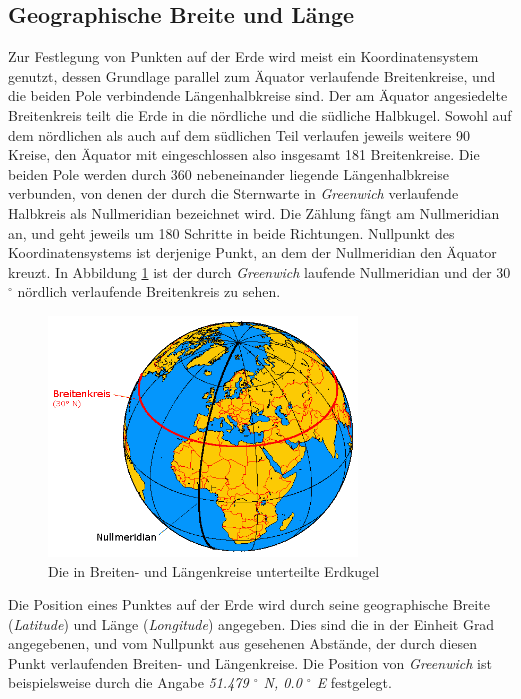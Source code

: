 \subsection{Geographische Breite und Länge}

Zur Festlegung von Punkten auf der Erde wird meist ein
Koordinatensystem genutzt, dessen Grundlage parallel zum Äquator
verlaufende Breitenkreise, und die beiden Pole verbindende
Längenhalbkreise sind. Der am Äquator angesiedelte Breitenkreis teilt
die Erde in die nördliche und die südliche Halbkugel. Sowohl auf dem
nördlichen als auch auf dem südlichen Teil verlaufen jeweils weitere
90 Kreise, den Äquator mit eingeschlossen also insgesamt 181
Breitenkreise. Die beiden Pole werden durch 360 nebeneinander liegende
Längenhalbkreise verbunden, von denen der durch die Sternwarte in
\textit{Greenwich} verlaufende Halbkreis als Nullmeridian bezeichnet
wird. Die Zählung fängt am Nullmeridian an, und geht jeweils um 180
Schritte in beide Richtungen. Nullpunkt des Koordinatensystems ist
derjenige Punkt, an dem der Nullmeridian den Äquator kreuzt. In
Abbildung \ref{koordinaten} ist der durch \textit{Greenwich} laufende
Nullmeridian und der 30 $^\circ$ nördlich verlaufende Breitenkreis zu
sehen.

\begin{figure}[h]
  \includegraphics[width=310px]{bilder/koordinaten}
  \caption{Die in Breiten- und Längenkreise unterteilte Erdkugel}
  \label{koordinaten}
\end{figure}

Die Position eines Punktes auf der Erde wird durch seine geographische
Breite (\textit{Latitude}) und Länge (\textit{Longitude})
angegeben. Dies sind die in der Einheit Grad angegebenen, und vom
Nullpunkt aus gesehenen Abstände, der durch diesen Punkt verlaufenden
Breiten- und Längenkreise. Die Position von \textit{Greenwich} ist
beispielsweise durch die Angabe \textit{51.479 $^\circ$ N, 0.0
  $^\circ$ E} festgelegt.



